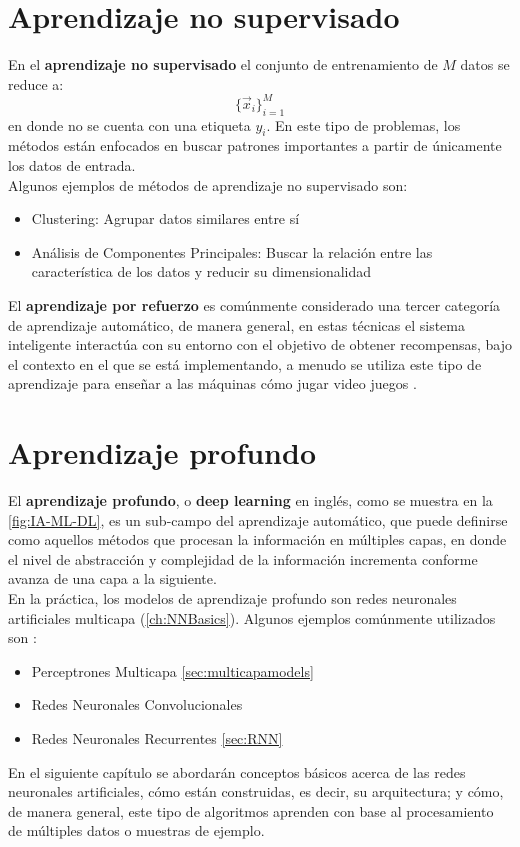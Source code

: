 \section{Aprendizaje no supervisado}
En el \textbf{aprendizaje no supervisado} el conjunto de entrenamiento de $M$ datos se reduce a:
\[ \{\vec{x}_i\}_{i=1}^M \]
en donde no se cuenta con una etiqueta $y_i$. En este tipo de problemas, los métodos están enfocados en buscar patrones importantes a partir de únicamente los datos de entrada.
\\
Algunos ejemplos de métodos de aprendizaje no supervisado son:
\begin{itemize}[label=\textcolor{CTtitle}{\textbullet}]
\item Clustering: Agrupar datos similares entre sí
\item Análisis de Componentes Principales: Buscar la relación entre las característica de los datos y reducir su dimensionalidad
\end{itemize}

El \textbf{aprendizaje por refuerzo} es comúnmente considerado una tercer categoría de aprendizaje automático, de manera general, en estas técnicas el sistema inteligente interactúa con su entorno con el objetivo de obtener recompensas, bajo el contexto en el que se está implementando, a menudo se utiliza este tipo de aprendizaje para enseñar a las máquinas cómo jugar video juegos \cite{Ivan:2019}.

\section{Aprendizaje profundo}
El \textbf{aprendizaje profundo}, o \textbf{deep learning} \cite{Bengio2009} en inglés, como se muestra en la \autoref{fig:IA-ML-DL}, es un sub-campo del aprendizaje automático, que puede definirse como aquellos métodos que procesan la información en múltiples capas, en donde el nivel de abstracción y complejidad de la información incrementa conforme avanza de una capa a la siguiente.
\\
En la práctica, los modelos de aprendizaje profundo son redes neuronales artificiales multicapa (\autoref{ch:NNBasics}). Algunos ejemplos comúnmente utilizados son \cite{Ivan:2019}:
\begin{itemize}[label=\textcolor{CTtitle}{\textbullet}]
\item Perceptrones Multicapa \autoref{sec:multicapamodels}
\item Redes Neuronales Convolucionales
\item Redes Neuronales Recurrentes \autoref{sec:RNN}
\end{itemize}

En el siguiente capítulo se abordarán conceptos básicos acerca de las redes neuronales artificiales, cómo están construidas, es decir, su arquitectura; y cómo, de manera general, este tipo de algoritmos aprenden con base al procesamiento de múltiples datos o muestras de ejemplo.



